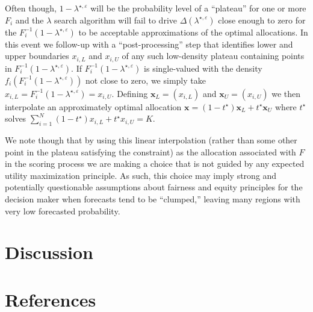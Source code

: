 \documentclass{article}
\begin{document}
Often though, $1-\lambda^{\star, \varepsilon}$ will be the probability level of a ``plateau'' for one or more $F_i$ and the $\lambda$ search algorithm will fail to drive $\Delta(\lambda^{\star, \varepsilon})$ close enough to zero for the $F_{i}^{-1}(1-\lambda^{\star, \varepsilon})$ to be acceptable approximations of the optimal allocations. In this event we follow-up with a ``post-processing'' step that identifies lower and upper boundaries $x_{i,L}$ and $x_{i,U}$ of any
such low-density plateau containing points in $F_{i}^{-1}(1-\lambda^{\star, \varepsilon})$. If $F_{i}^{-1}(1-\lambda^{\star, \varepsilon})$ is single-valued 
with the density $f_i(F_{i}^{-1}(1-\lambda^{\star, \varepsilon}))$ not close to zero, we simply take $x_{i,L} = F_{i}^{-1}(1-\lambda^{\star, \varepsilon}) = x_{i,U}$. Defining $\mathbf{x}_L = (x_{i,L})$ and $\mathbf{x}_U = (x_{i,U})$ we then interpolate an approximately optimal allocation 
$\mathbf{x} = (1-t^{\star})\mathbf{x}_L + t^{\star}\mathbf{x}_U$ where $t^{\star}$ solves 
$\sum_{i=1}^{N }(1-t^{\star})x_{i,L} + t^{\star}x_{i,U} = K$.

We note though that by using this linear interpolation (rather than some other point in the plateau satisfying the constraint) as the allocation associated with $F$ in the scoring process we are making a choice that is not
guided by any expected utility maximization principle. As such, this choice may imply strong and potentially questionable assumptions about fairness and
equity principles for the decision maker when forecasts tend to be ``clumped,'' leaving many regions with very low forecasted probability.


\section{Discussion}
\label{sec:discussion}


\section{References}


\end{document}

